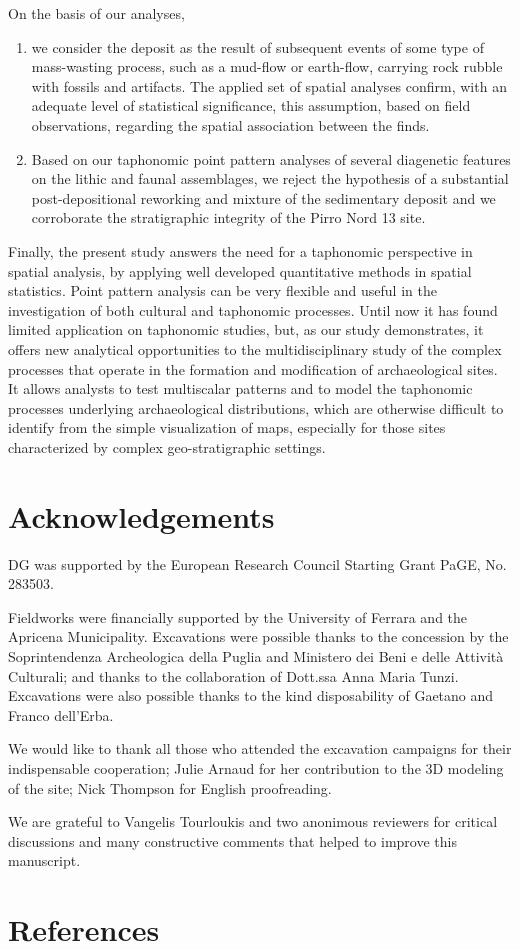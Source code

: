 \documentclass[review,authoryear]{elsarticle} %
\begin{document}
On the basis of our analyses,
\begin{enumerate}
  \item we consider the deposit as the result of subsequent events of some type of mass-wasting process, such as a mud-flow or earth-flow, carrying rock rubble with fossils and artifacts. The applied set of spatial analyses confirm, with an adequate level of statistical significance, this assumption, based on field observations, regarding the spatial association between the finds.
  \item Based on our taphonomic point pattern analyses of several diagenetic features on the lithic and faunal assemblages, we reject the hypothesis of a substantial post-depositional reworking and mixture of the sedimentary deposit and we corroborate the stratigraphic integrity of the Pirro Nord 13 site.
\end{enumerate}

Finally, the present study answers the need for a taphonomic perspective in spatial analysis, by applying well developed quantitative methods in spatial statistics. Point pattern analysis can be very flexible and useful in the investigation of both cultural and taphonomic processes. Until now it has found limited application on taphonomic studies, but, as our study demonstrates, it offers new analytical opportunities to the multidisciplinary study of the complex processes that operate in the formation and modification of archaeological sites. It allows analysts to test multiscalar patterns and to model the taphonomic processes underlying archaeological distributions, which are otherwise difficult to identify from the simple visualization of maps, especially for those sites characterized by complex geo-stratigraphic settings.

\section*{Acknowledgements}

DG was supported by the European Research Council Starting Grant PaGE, No. 283503.

Fieldworks were financially supported by the University of Ferrara and the Apricena Municipality. Excavations were possible thanks to the concession by the Soprintendenza Archeologica della Puglia and Ministero dei Beni e delle Attività Culturali; and thanks to the collaboration of Dott.ssa Anna Maria Tunzi. Excavations were also possible thanks to the kind disposability of Gaetano and Franco dell'Erba.

We would like to thank all those who attended the excavation campaigns for their indispensable cooperation; Julie Arnaud for her contribution to the 3D modeling of the site; Nick Thompson for English proofreading.

We are grateful to Vangelis Tourloukis and two anonimous reviewers for critical discussions and many constructive comments that helped to improve this manuscript.

\section*{References}



\end{document}
